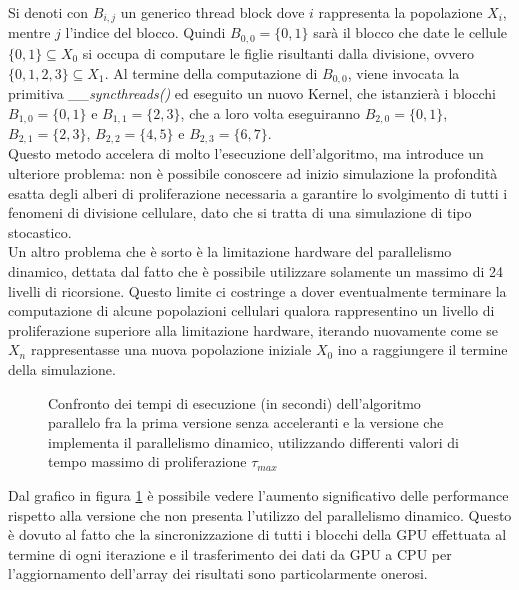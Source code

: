 Si denoti con $B_{i,j}$ un generico thread block dove
$i$ rappresenta la popolazione $X_{i}$, mentre $j$ l'indice del blocco.
Quindi $B_{0,0} = \{0, 1\}$ sarà il blocco che date le
cellule $\{0, 1\} \subseteq X_{0}$ si occupa di
computare le figlie risultanti dalla divisione, ovvero
$\{0, 1, 2, 3\} \subseteq X_{1}$.
Al termine della computazione di $B_{0,0}$, viene invocata la primitiva 
\textit{\_\_syncthreads()} ed eseguito un nuovo Kernel, che istanzierà
i blocchi $B_{1,0} = \{0, 1\}$ e $B_{1,1} = \{2, 3\}$, che a loro volta
eseguiranno $B_{2,0} = \{0, 1\}$, $B_{2,1} = \{2, 3\}$,
$B_{2,2} = \{4, 5\}$ e $B_{2,3} = \{6, 7\}$.
\\
Questo metodo accelera di molto l'esecuzione dell'algoritmo, ma introduce un
ulteriore problema: non è possibile conoscere ad inizio simulazione la
profondità esatta degli alberi di proliferazione necessaria a garantire lo
svolgimento di tutti i fenomeni di divisione cellulare, dato che si tratta di
una simulazione di tipo stocastico.
\\
Un altro problema che è sorto è la limitazione hardware del parallelismo
dinamico, dettata dal fatto che è possibile utilizzare solamente un massimo
di 24 livelli di ricorsione. Questo limite ci costringe a dover
eventualmente terminare la computazione di alcune popolazioni cellulari qualora
rappresentino un livello di proliferazione superiore alla limitazione hardware,
iterando nuovamente come se $X_{n}$ rappresentasse una nuova
popolazione iniziale $X_{0}$ ino a raggiungere il termine della simulazione.

\begin{figure}[t]
    \centering
    \caption{Confronto dei tempi di esecuzione (in secondi) dell'algoritmo
    parallelo fra la prima versione senza acceleranti e la versione
    che implementa il parallelismo dinamico, utilizzando differenti valori di
    tempo massimo di proliferazione $\tau_{max}$}
    \label{chart:original-dynamic}
\end{figure}
Dal grafico in figura \ref{chart:original-dynamic} è possibile vedere
l'aumento significativo delle
performance rispetto alla versione che non presenta l'utilizzo del
parallelismo dinamico. Questo è dovuto al fatto che la
sincronizzazione di tutti i blocchi della GPU effettuata al termine di ogni
iterazione e il trasferimento
dei dati da GPU a CPU per l'aggiornamento dell'array dei risultati sono
particolarmente onerosi.


